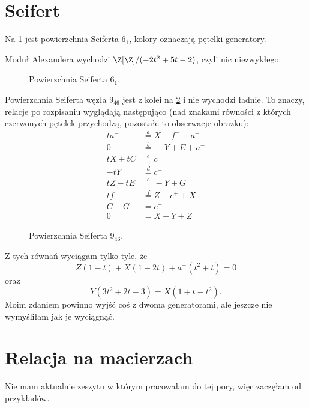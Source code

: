 \section{Seifert}


Na \cref{pow61} jest powierzchnia Seiferta $6_1$, kolory oznaczają pętelki-generatory.

Moduł Alexandera wychodzi $\Z[\Z]/(-2t^2+5t-2)$, czyli nic niezwykłego.

\begin{figure}[h]\centering
  
\caption{\label{pow61}Powierzchnia Seiferta $6_1$.}
\end{figure}


Powierzchnia Seiferta węzła $9_{46}$ jest z kolei na \cref{pow946} i nie wychodzi ładnie. To znaczy, relacje po rozpisaniu wyglądają następująco (nad znakami równości z których czerwonych pętelek przychodzą, pozostałe to obserwacje obrazku):
\begin{align*}
  ta^- &\overset{a}{=} X-f^--a^-\\ 
  0&\overset{b}{=}-Y+E+a^-\\ 
  tX+tC&\overset{c}{=}c^+\\ 
  -tY&\overset{d}{=}c^+ \\ 
  tZ-tE&\overset{e}{=}-Y+G\\ 
  tf^- &\overset{f}{=}Z-c^++X\\ 
  C-G&=c^+\\ 
  0&=X+Y+Z
\end{align*}
\begin{figure}[h]\centering
  
  \caption{\label{pow946}Powierzchnia Seiferta $9_{46}$.}
\end{figure}

Z tych równań wyciągam tylko tyle, że 
$$Z(1-t)+X(1-2t)+a^-(t^2+t)=0$$
oraz
$$Y(3t^2+2t-3)=X(1+t-t^2).$$
Moim zdaniem powinno wyjść coś z dwoma generatorami, ale jeszcze nie wymyśliłam jak je wyciągnąć.

\section{Relacja na macierzach}

Nie mam aktualnie zeszytu w którym pracowałam do tej pory, więc zaczęłam od przykładów.

